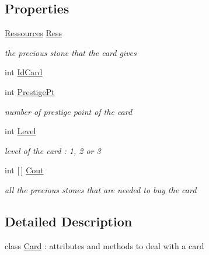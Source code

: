\subsection*{Properties}
\begin{DoxyCompactItemize}
\item 
\hyperlink{namespace_splendor_abc955fe800ad5f701f777df0a2a29dc2}{Ressources} \hyperlink{class_splendor_1_1_card_afcfaa7ea5072b3cd30c04adddc8dd5c7}{Ress}
\begin{DoxyCompactList}\small\item\em the precious stone that the card gives \end{DoxyCompactList}\item 
int \hyperlink{class_splendor_1_1_card_a1ea37cdd596ce83ac8090a5fb19dcd0e}{Id\+Card}
\item 
int \hyperlink{class_splendor_1_1_card_a117119ceac083b7b7d39f11e5bbd7225}{Prestige\+Pt}
\begin{DoxyCompactList}\small\item\em number of prestige point of the card \end{DoxyCompactList}\item 
int \hyperlink{class_splendor_1_1_card_aadc9953aeb322c82e04fbd9b5a3b996d}{Level}
\begin{DoxyCompactList}\small\item\em level of the card \+: 1, 2 or 3 \end{DoxyCompactList}\item 
int \mbox{[}$\,$\mbox{]} \hyperlink{class_splendor_1_1_card_af3c65d4d543f453d5c481682233745c7}{Cout}
\begin{DoxyCompactList}\small\item\em all the precious stones that are needed to buy the card \end{DoxyCompactList}\end{DoxyCompactItemize}


\subsection{Detailed Description}
class \hyperlink{class_splendor_1_1_card}{Card} \+: attributes and methods to deal with a card 



